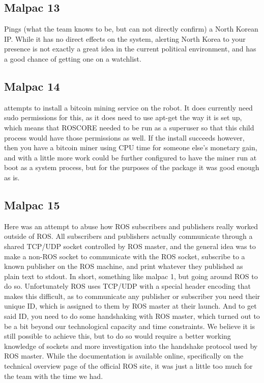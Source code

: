 \documentclass[IEEEtran,letterpaper,10pt,notitlepage,draftclsnofoot,onecolumn]{article}
\begin{document}
\subsection{Malpac 13}
Pings (what the team knows to be, but can not directly confirm) a North Korean IP. While it has no direct effects on the system,
alerting North Korea to your presence is not exactly a great idea in the current political environment, and has a good chance
of getting one on a watchlist. 

\subsection{Malpac 14}
attempts to install a bitcoin mining service on the robot.
It does currently need sudo permissions for this, as it does need to use apt-get the way it is set up, which means that ROSCORE needed to be run as a superuser so that this child process would have those permissions as well.
If the install succeeds however, then you have a bitcoin miner using CPU time for someone else’s monetary gain, and with a little more work could be further configured to have the miner run at boot as a system process, but for the purposes of the package it was good enough as is.

\subsection{Malpac 15}
Here was an attempt to abuse how ROS subscribers and publishers really worked outside of ROS.
All subscribers and publishers actually communicate through a shared TCP/UDP socket controlled by ROS master, and the general idea was to make a non-ROS socket to communicate with the ROS socket, subscribe to a known publisher on the ROS machine, and print whatever they published as plain text to stdout.
In short, something like malpac 1, but going around ROS to do so. Unfortunately ROS uses TCP/UDP with a special header encoding that makes this difficult, as to communicate any publisher or subscriber you need their unique ID, which is assigned to them by ROS master at their launch.
And to get said ID, you need to do some handshaking with ROS master, which turned out to be a bit beyond our technological capacity and time constraints.
We believe it is still possible to achieve this, but to do so would require a better working knowledge of sockets and more investigation into the handshake protocol used by ROS master.
While the documentation is available online, specifically on the technical overview page of the official ROS site\cite{ROS}, it was just a little too much for the team with the time we had.
\end{document}

